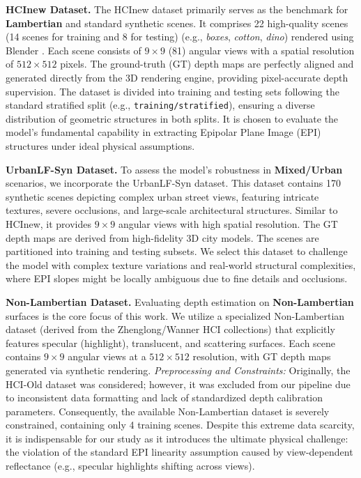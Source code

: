 \documentclass[lettersize,journal]{IEEEtran}
\begin{document}
\textbf{HCInew Dataset.} The HCInew dataset primarily serves as the benchmark for \textbf{Lambertian} and standard synthetic scenes. It comprises 22 high-quality scenes (14 scenes for training and 8 for testing) (e.g., \textit{boxes}, \textit{cotton}, \textit{dino}) rendered using Blender \cite{dosovitskiy2021}. Each scene consists of $9 \times 9$ (81) angular views with a spatial resolution of $512 \times 512$ pixels. The ground-truth (GT) depth maps are perfectly aligned and generated directly from the 3D rendering engine, providing pixel-accurate depth supervision. The dataset is divided into training and testing sets following the standard stratified split (e.g., \texttt{training/stratified}), ensuring a diverse distribution of geometric structures in both splits. It is chosen to evaluate the model's fundamental capability in extracting Epipolar Plane Image (EPI) structures under ideal physical assumptions.

\textbf{UrbanLF-Syn Dataset.} To assess the model's robustness in \textbf{Mixed/Urban} scenarios, we incorporate the UrbanLF-Syn dataset. This dataset contains 170 synthetic scenes depicting complex urban street views, featuring intricate textures, severe occlusions, and large-scale architectural structures. Similar to HCInew, it provides $9 \times 9$ angular views with high spatial resolution. The GT depth maps are derived from high-fidelity 3D city models. The scenes are partitioned into training and testing subsets. We select this dataset to challenge the model with complex texture variations and real-world structural complexities, where EPI slopes might be locally ambiguous due to fine details and occlusions.

\textbf{Non-Lambertian Dataset.} Evaluating depth estimation on \textbf{Non-Lambertian} surfaces is the core focus of this work. We utilize a specialized Non-Lambertian dataset (derived from the Zhenglong/Wanner HCI collections) that explicitly features specular (highlight), translucent, and scattering surfaces. Each scene contains $9 \times 9$ angular views at a $512 \times 512$ resolution, with GT depth maps generated via synthetic rendering. \textit{Preprocessing and Constraints:} Originally, the HCI-Old dataset was considered; however, it was excluded from our pipeline due to inconsistent data formatting and lack of standardized depth calibration parameters. Consequently, the available Non-Lambertian dataset is severely constrained, containing only 4 training scenes. Despite this extreme data scarcity, it is indispensable for our study as it introduces the ultimate physical challenge: the violation of the standard EPI linearity assumption caused by view-dependent reflectance (e.g., specular highlights shifting across views).
\end{document}
